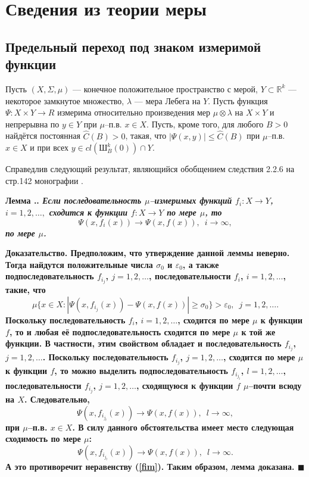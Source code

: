 \documentclass{report}
\newcounter{lem}[section]
\renewcommand{\thelem}{\thesection.\arabic{lem}}
\newenvironment{Lemma}{\par\refstepcounter{lem}\bf Лемма \thelem. \it}{\rm\par}
\newenvironment{Proof}{\par\noindent\bf Доказательство.\rm}{ $\blacksquare$\par}
\begin{document}
    \chapter{Сведения из теории меры}
        \section{Предельный переход под знаком измеримой функции}
Пусть $(X,\Sigma,\mu)$ --- конечное положительное пространство с мерой, $Y\subset\mathbb{R}^k$ --- некоторое замкнутое множество, $\lambda$ --- мера Лебега на $Y$. Пусть функция
$\Psi\colon X\times Y\to R$ измерима относительно произведения мер $\mu\otimes\lambda$ на $X\times Y$ и непрерывна по $y\in Y$ при $\mu$--п.в. $x\in X$. Пусть, кроме того, для любого
$B>0$ найдётся постоянная $\hat{C}(B)>0$, такая, что $|\Psi(x,y)|\leqslant\hat{C}(B)$ при  $\mu$--п.в. $x\in X$ и при всех $y\in cl(\textrm{Ш}_B^{k}(0))\cap Y$.

Справедлив следующий результат, являющийся обобщением следствия 2.2.6 на стр.142 монографии \cite{BogachyovVI}.
\begin{Lemma}\label{meas:convergence}
Если последовательность $\mu$--измеримых функций $f_i\colon X\to Y$, $i=1,2,\dots,$ сходится к функции $f\colon X\to Y$ по мере $\mu$, то
$$
\Psi(x,f_i(x))\to\Psi(x,f(x)),\,\,\,i\to\infty,
$$
по мере $\mu$.
\end{Lemma}
\begin{Proof}
Предположим, что утверждение данной леммы неверно. Тогда найдутся положительные числа $\sigma_0$ и $\varepsilon_0$, а также подпоследовательность $f_{i_j}$, $j=1,2,\dots$,
последовательности $f_{i}$, $i=1,2,\dots$, такие, что
\begin{equation}\label{fim}
\mu\{x\in X:|\Psi(x,f_{i_j}(x))-\Psi(x,f(x))|\geqslant\sigma_0\}>\varepsilon_0,\,\,\,j=1,2,\dots.
\end{equation}
Поскольку последовательность $f_{i}$, $i=1,2,\dots$, сходится по мере $\mu$ к функции $f$, то и любая её подпоследовательность сходится по мере $\mu$ к той же функции. В частности, этим
свойством обладает и последовательность $f_{i_j}$, $j=1,2,\dots$. Поскольку последовательность $f_{i_j}$, $j=1,2,\dots$, сходится по мере  $\mu$  к функции  $f$, то можно выделить
подпоследовательность $f_{i_{j_l}}$, $l=1,2,\dots$, последовательности   $f_{i_j}$, $j=1,2,\dots$, сходящуюся к функции $f$  $\mu$--почти  всюду на $X$. Следовательно,
$$
\Psi(x,f_{i_{j_l}}(x))\to\Psi(x,f(x)),\,\,\,l\to\infty,
  $$
при  $\mu$--п.в. $x\in X$. В силу данного обстоятельства имеет место следующая сходимость по мере  $\mu$:
$$
\Psi(x,f_{i_{j_l}}(x))\to\Psi(x,f(x)),\,\,\,l\to\infty.
  $$
А это противоречит неравенству (\ref{fim}). Таким образом, лемма доказана.
\end{Proof}
\end{document}
